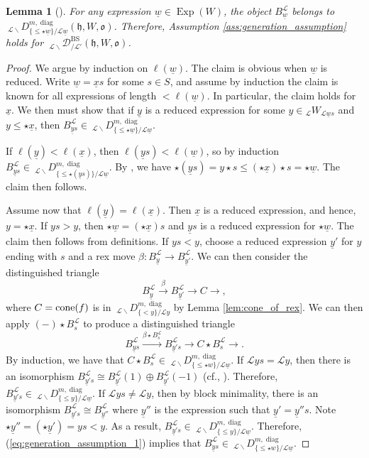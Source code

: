 \documentclass{amsart}
\newcommand{\scrL}{\mathcal{L}}
\newcommand{\fr}[1]{\mathfrak{#1}}
\DeclareMathOperator{\diag}{diag}
\DeclareMathOperator{\BS}{BS}
\newcommand{\EWmon}[2]{\:_{#1 \backslash} \mathcal{D}_{/ #2} }
\newcommand{\DDBEI}[3]{\:_{#2 \backslash} D_{#1 / #3}^{m, \diag} }
\DeclareMathOperator{\Exp}{Exp}
\newcommand{\W}[2]{{}_{#1}W_{#2}}
\newcommand{\uw}{\underline{w}}
\newcommand{\ux}{\underline{x}}
\newcommand{\uy}{\underline{y}}
\newtheorem{lemma}[subsubsection]{Lemma}
\theoremstyle{definition}
\numberwithin{equation}{subsection}
\begin{document}
\begin{lemma}[{\cite[Lemma 6.2]{ARV}}]\label{lem:generation_assumption}
    For any expression $\uw \in \Exp (W)$, the object $B_{\uw}^{\scrL}$ belongs to $\DDBEI{\{ \leq \star \uw \}}{\scrL}{\scrL \uw} (\fr{h}, W, \fr{o})$.
    Therefore, Assumption \ref{ass:generation_assumption} holds for $\EWmon{\scrL}{\scrL'}^{\BS} (\fr{h}, W, \fr{o})$.
\end{lemma}
\begin{proof}
    We argue by induction on $\ell (\uw)$. The claim is obvious when $\uw$ is reduced.
    Write $\uw = \ux s$ for some $s \in S$, and assume by induction the claim is known for all expressions of length $< \ell (\uw)$. In particular, the claim holds for $\ux$.
    We then must show that if $\uy$ is a reduced expression for some $y \in \W{\scrL}{\scrL \uw s}$ and $y \leq \star \ux$, then $B_{\uy s}^{\scrL} \in  \DDBEI{\{ \leq \star \uw \}}{\scrL}{\scrL \uw}$.

    If $\ell (\uy) < \ell (\ux)$, then $\ell (\uy s) < \ell (\uw)$, so by induction $B_{\uy s}^{\scrL} \in  \DDBEI{ \{ \leq \star (\uy s) \}}{\scrL}{\scrL \uw}$.
    By \cite[Proposition 3.1]{BM}, we have $\star (\uy s) = y \star s \leq (\star \ux ) \star s = \star \uw$. The claim then follows.

    Assume now that $\ell (\uy) = \ell (\ux)$. Then $\ux$ is a reduced expression, and hence, $y = \star \ux$.
    If $y s > y$, then $\star \uw = (\star \ux) s$ and $\uy s$ is a reduced expression for $\star \uw$. The claim then follows from definitions.
    If $ys < y$, choose a reduced expression $\uy'$ for $y$ ending with $s$ and a rex move $\beta : B_{\uy}^{\scrL} \to B_{\uy'}^{\scrL}$.
    We can then consider the distinguished triangle
    \[B_{\uy}^{\scrL} \stackrel{\beta}{\to} B_{\uy'}^{\scrL} \to C \to,\]
    where $C = \textnormal{cone} (f)$ is in $\DDBEI{\{ < y \}}{\scrL}{\scrL y} $ by Lemma \ref{lem:cone_of_rex}.
    We can then apply $(-) \star B_s^{\scrL}$ to produce a distinguished triangle
    \begin{equation}\label{eq:generation_assumption_1}
        B_{\uy s}^{\scrL} \stackrel{\beta \star B_s^{\scrL}}{\to} B_{\uy' s}^{\scrL} \to C \star B_s^{\scrL} \to.
    \end{equation}
    By induction, we have that $C \star B_s^{\scrL} \in \DDBEI{\{ \leq \star w \}}{\scrL}{\scrL \uw } $.
    If $\scrL ys = \scrL y$, then there is an isomorphism $B_{\uy' s}^{\scrL} \cong B_{\uy'}^{\scrL} (1) \oplus B_{\uy'}^{\scrL} (-1)$ (cf., \cite[(5.14)]{EW}).
    Therefore, $B_{\uy' s}^{\scrL} \in \DDBEI{\{ \leq y \}}{\scrL}{\scrL \uw } $.
    If $\scrL ys \neq \scrL y$, then by block minimality, there is an isomorphism $B_{\uy' s}^{\scrL} \cong B_{\uy''}^{\scrL}$ where $\uy''$ is the expression such that $\uy' = \uy'' s$.
    Note $\star \uy'' = (\star \uy') = ys < y$.
    As a result, $B_{\uy' s}^{\scrL} \in \DDBEI{\{ \leq y \}}{\scrL}{\scrL \uw }$.
    Therefore, (\ref{eq:generation_assumption_1}) implies that $B_{\uy s}^{\scrL} \in \DDBEI{ \{ \leq \star w \}}{\scrL}{\scrL \uw }$.
\end{proof}
\end{document}
